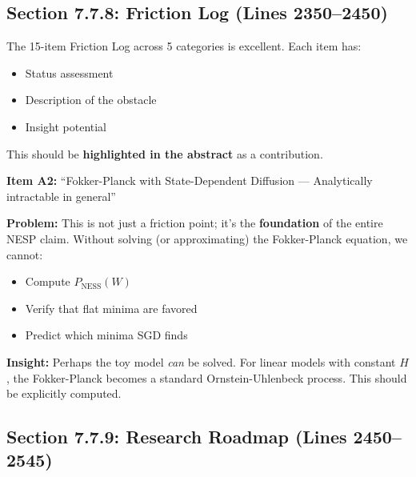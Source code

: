 \documentclass[11pt]{article}
\begin{document}
\subsection{Section 7.7.8: Friction Log (Lines 2350--2450)}

\begin{insightbox}
The 15-item Friction Log across 5 categories is excellent. Each item has:
\begin{itemize}
    \item Status assessment
    \item Description of the obstacle
    \item Insight potential
\end{itemize}

This should be \textbf{highlighted in the abstract} as a contribution.
\end{insightbox}

\begin{vuongmacbox}
\textbf{Item A2:} ``Fokker-Planck with State-Dependent Diffusion --- Analytically intractable in general''

\textbf{Problem:} This is not just a friction point; it's the \textbf{foundation} of the entire NESP claim. Without solving (or approximating) the Fokker-Planck equation, we cannot:
\begin{itemize}
    \item Compute $P_{\mathrm{NESS}}(W)$
    \item Verify that flat minima are favored
    \item Predict which minima SGD finds
\end{itemize}

\textbf{Insight:} Perhaps the toy model \emph{can} be solved. For linear models with constant $H$, the Fokker-Planck becomes a standard Ornstein-Uhlenbeck process. This should be explicitly computed.
\end{vuongmacbox}

\subsection{Section 7.7.9: Research Roadmap (Lines 2450--2545)}
\end{document}
